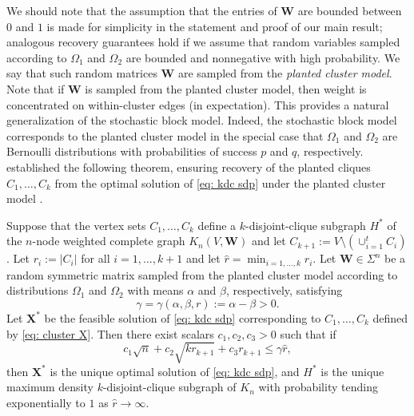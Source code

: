 \documentclass[twoside,11pt]{article}
\newcommand{\bs}{\boldsymbol}
\newcommand{\X}{\bs {X}}
\newcommand{\W}{\bs {W}}
\newcommand{\0}{\bs{0}}
\newcommand{\rbra}[1]{\ensuremath{\left( #1 \right)}} %
\newcommand{\ra}{\rightarrow}
\newcommand{\kdc}{\(k\)-disjoint-clique }
\begin{document}
{We should note that the assumption that the entries of \(\W\) are bounded between \(0\) and
\(1\) is made for simplicity in the statement and proof of our main result;
analogous recovery guarantees hold if we assume that random variables
sampled according to \(\Omega_1\) and \(\Omega_2\)
are bounded and nonnegative with high probability.
We say that such random matrices \(\W\) are sampled from the \emph{planted cluster model}.
Note that if \(\W\) is sampled from the planted cluster model, then weight is concentrated
on within-cluster edges (in expectation).
This provides a natural generalization of the stochastic block model.
Indeed, the stochastic block model corresponds to the planted cluster model
in the special case that \(\Omega_1\) and \(\Omega_2\) are Bernoulli distributions with probabilities of
success \(p\) and \(q\), respectively.
\cite{ames2014guaranteed} established the following theorem, ensuring recovery of the planted cliques
\(C_1, \dots, C_k\) from the optimal solution of \eqref{eq: kdc sdp} under the planted cluster model \citep[see][Theorem 2.1]{ames2014guaranteed}.

\begin{theorem}
	\label{thm: old rec}
	Suppose that the vertex sets \(C_1, \dots, C_k\) define a \kdc subgraph \(H^*\) of the
	\(n\)-node weighted complete graph \(K_n(V, \W)\) and let \(C_{k+1} := V \setminus \rbra{ \cup^t_{i=1} C_i } \).
	Let \(r_i := |C_i|\) for all \(i=1,\dots, k+1\)
	and let \( \hat r = \min_{i=1,\dots,k} r_i.\)
	Let \( \W \in \Sigma^n\) be a random symmetric matrix sampled from the planted cluster model
	according to distributions \(\Omega_1\) and \(\Omega_2\) with means \(\alpha\) and \( \beta\), respectively,	satisfying
	\[
	\gamma = \gamma(\alpha, \beta, r):=
	\alpha - \beta > 0.
	\]
	Let \(\X^*\) be the feasible solution of \eqref{eq: kdc sdp} corresponding to \(C_1,\dots, C_k\)
	defined by \eqref{eq: cluster X}.
	Then there exist scalars \(c_1, c_2, c_3 > 0\) such that if
	\begin{equation} \label{eq: old rec}
	c_1 \sqrt{n} + c_2 \sqrt{k r_{k+1}} + c_3 r_{k+1} \le \gamma \hat r,
	\end{equation}
	then \( \X^* \) is the unique optimal solution of \eqref{eq: kdc sdp},
	and \( H^*\) is the unique maximum density \kdc subgraph of \(K_n\)
	with probability tending exponentially to \(1\) as \(\hat r \ra \infty\).
\end{theorem}

}
\end{document}
